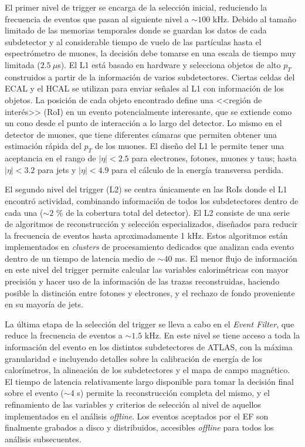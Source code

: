 El primer nivel de trigger se encarga de la selección inicial, reduciendo la frecuencia de eventos que pasan al siguiente nivel a $\sim100$ kHz. Debido al tamaño limitado de las memorias temporales donde se guardan los datos de cada subdetector y al considerable tiempo de vuelo de las partículas hasta el espectrómetro de muones, la decisión debe tomarse en una escala de tiempo muy limitada ($2.5 \:\mu$s). El L1 está basado en hardware y selecciona objetos de alto $p_{T}$ construidos a partir de la información de varios subdetectores. Ciertas celdas del ECAL y el HCAL se utilizan para enviar señales al L1 con información de los objetos. La posición de cada objeto encontrado define una <<región de interés>> (RoI) en un evento potencialmente interesante, que se extiende como un
cono desde el punto de interacción a lo largo del detector. Lo mismo en el detector de muones, que tiene diferentes cámaras que permiten obtener una estimación rápida del $p_{T}$ de los muones. El diseño del L1 le permite tener una aceptancia en el rango de $|\eta|<2.5$ para electrones, fotones, muones y taus; hasta $|\eta|<3.2$ para jets y $|\eta|<4.9$ para el cálculo de la energía transversa perdida.

El segundo nivel del trigger (L2) se centra únicamente en las RoIs donde el L1 encontró actividad, combinando información de todos los subdetectores dentro de cada una ($\sim2$ \% de la cobertura total del detector). El L2 consiste de una serie de algoritmos de reconstrucción y selección especializados, diseñados para reducir la frecuencia de eventos hasta aproximadamente 1 kHz. Estos algoritmos están implementados en \textit{clusters} de procesamiento dedicados que analizan cada evento dentro de un tiempo de latencia medio de $\sim40$ ms. El menor flujo de información en este nivel del trigger permite calcular las variables calorimétricas con mayor precisión y hacer uso de la información de las trazas reconstruidas, haciendo posible la distinción entre fotones y electrones, y el rechazo de fondo proveniente en su mayoría de jets.

La última etapa de la selección del trigger se lleva a cabo en el \textit{Event Filter}, que reduce la frecuencia de eventos a $\sim 1.5$ kHz. En este nivel se tiene acceso a toda la información del evento en los distintos subdetectores de ATLAS, con la máxima granularidad e incluyendo detalles sobre la calibración de energía de los calorímetros, la alineación de los subdetectores y el mapa de campo magnético. El tiempo de latencia relativamente largo disponible para tomar la decisión final sobre el evento ($\sim4$ s) permite la reconstrucción completa del mismo, y el refinamiento de las variables y criterios de selección al nivel de aquellos implementados en el análisis \textit{offline}. Los eventos aceptados por el EF son finalmente grabados a disco y distribuidos, accesibles \textit{offline} para todos los análisis subsecuentes.


